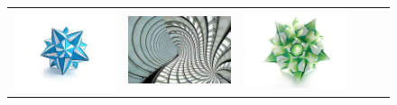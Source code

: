\begin{figure}
\begin{minipage}[t]{\textwidth}
\begin{tabular}{m{.01\linewidth} m{.16\linewidth} m{.16\linewidth} m{.16\linewidth} m{.16\linewidth} m{.16\linewidth}}
    \includegraphics[width=\linewidth]{../style/figures/flickr_on_flickr/pred_style_Geometric_Composition/2.jpg} &
    \includegraphics[width=\linewidth]{../style/figures/flickr_on_flickr/pred_style_Geometric_Composition/3.jpg} &
    \includegraphics[width=\linewidth]{../style/figures/flickr_on_flickr/pred_style_Geometric_Composition/4.jpg} \\

\end{tabular}
\end{minipage}
\end{figure}
